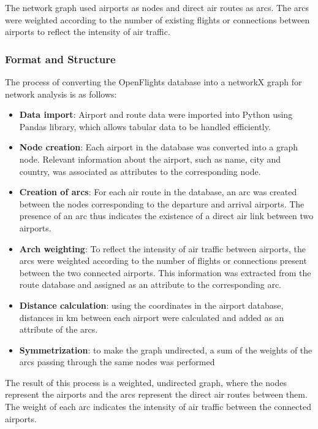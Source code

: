 \documentclass[12pt]{article}
\begin{document}
The network graph used airports as nodes and direct air routes as arcs. The arcs were weighted according to the number of existing flights or connections between airports to reflect the intensity of air traffic.

\subsubsection{Format and Structure}
The process of converting the OpenFlights database into a networkX graph for network analysis is as follows:
\begin{itemize}
    \item \textbf{Data import}: Airport and route data were imported into Python using Pandas library, which allows tabular data to be handled efficiently.
    \item \textbf{Node creation}: Each airport in the database was converted into a graph node. Relevant information about the airport, such as name, city and country, was associated as attributes to the corresponding node.
    \item \textbf{Creation of arcs}: For each air route in the database, an arc was created between the nodes corresponding to the departure and arrival airports. The presence of an arc thus indicates the existence of a direct air link between two airports.
    \item \textbf{Arch weighting}: To reflect the intensity of air traffic between airports, the arcs were weighted according to the number of flights or connections present between the two connected airports. This information was extracted from the route database and assigned as an attribute to the corresponding arc.
    \item \textbf{Distance calculation}: using the coordinates in the airport database, distances in km between each airport were calculated and added as an attribute of the arcs.
    \item \textbf{Symmetrization}: to make the graph undirected, a sum of the weights of the arcs passing through the same nodes was performed
\end{itemize}
The result of this process is a weighted, undirected graph, where the nodes represent the airports and the arcs represent the direct air routes between them. The weight of each arc indicates the intensity of air traffic between the connected airports.
\end{document}
